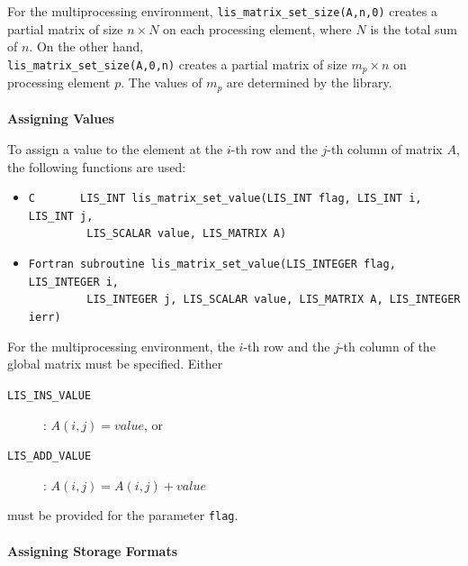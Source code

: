 \documentclass[a4paper]{article}
\begin{document}
For the multiprocessing environment, \verb|lis_matrix_set_size(A,n,0)| creates
a partial matrix of size $n \times N$ on each processing element, 
where $N$ is the total sum of $n$. 
On the other hand, \\
\verb|lis_matrix_set_size(A,0,n)| creates 
a partial matrix of size $m_p \times n$ on processing element $p$.
The values of $m_p$ are determined by the library.
\\ \\
\noindent
{\bf Assigning Values}

To assign a value to the element at the $i$-th row and the $j$-th column of
matrix $A$, 
the following functions are used: 
\begin{itemize}
\item \verb|C       LIS_INT lis_matrix_set_value(LIS_INT flag, LIS_INT i, LIS_INT j,|\\
      \verb|         LIS_SCALAR value, LIS_MATRIX A)|
\item \verb|Fortran subroutine lis_matrix_set_value(LIS_INTEGER flag, LIS_INTEGER i,|\\
      \verb|         LIS_INTEGER j, LIS_SCALAR value, LIS_MATRIX A, LIS_INTEGER ierr)|
\end{itemize}
For the multiprocessing environment, the $i$-th row and the $j$-th column of the global matrix 
must be specified. 
Either
\begin{description}
\item[\tt LIS\_INS\_VALUE]: $A(i,j) = value$, or
\item[\tt LIS\_ADD\_VALUE]: $A(i,j) = A(i,j) + value$
\end{description}
must be provided for the parameter \verb+flag+.
\\ \\
\noindent
{\bf Assigning Storage Formats}
\end{document}
